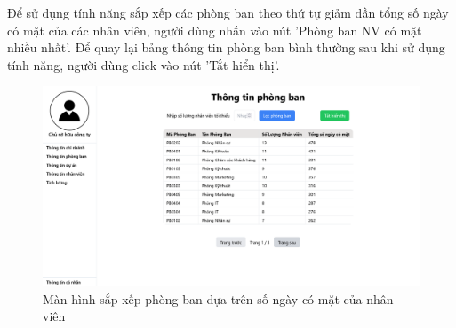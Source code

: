 Để sử dụng tính năng sắp xếp các phòng ban theo thứ tự giảm dần tổng số ngày có mặt của các nhân viên, người dùng nhấn vào nút 'Phòng ban NV có mặt nhiều nhất'. Để quay lại bảng thông tin phòng ban bình thường sau khi sử dụng tính năng, người dùng click vào nút 'Tắt hiển thị'.
\begin{figure}[H]
    \centering
    \includegraphics[width=1\linewidth]{content/images/ManHinh_2_c.png}
    \caption{Màn hình sắp xếp phòng ban dựa trên số ngày có mặt của nhân viên}
    \label{fig:ManHinh_2_c}
\end{figure}

